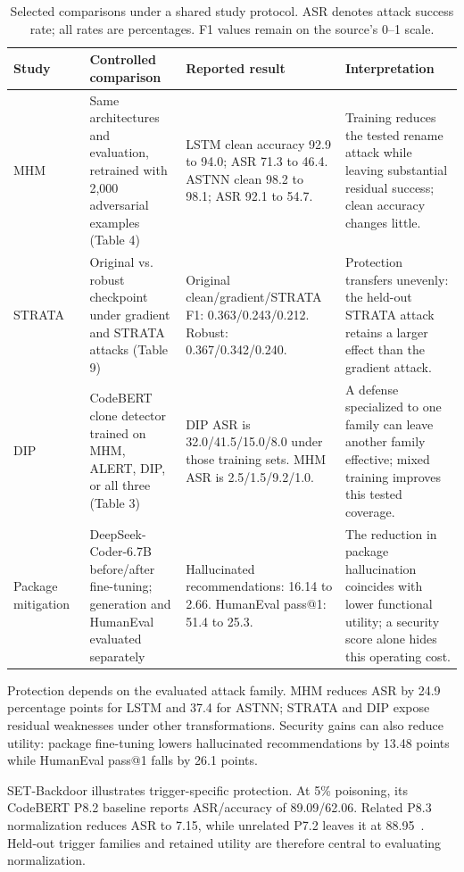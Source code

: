 \documentclass[acmsmall,screen,review,nonacm]{acmart}
\begin{document}
\begin{table}[t]
\centering
\small
\caption{Selected comparisons under a shared study protocol. ASR denotes attack success rate; all rates are percentages. F1 values remain on the source's 0--1 scale.}
\label{tab:within-study}
\begin{tabularx}{\textwidth}{@{}L{2.15cm}L{3.45cm}L{4.1cm}Y@{}}
\toprule
\textbf{Study} & \textbf{Controlled comparison} & \textbf{Reported result} & \textbf{Interpretation} \\
\midrule
MHM~\cite{zhang2020generating} & Same architectures and evaluation, retrained with 2,000 adversarial examples (Table 4) & LSTM clean accuracy 92.9 to 94.0; ASR 71.3 to 46.4. ASTNN clean 98.2 to 98.1; ASR 92.1 to 54.7. & Training reduces the tested rename attack while leaving substantial residual success; clean accuracy changes little. \\
STRATA~\cite{springer2020strata} & Original vs. robust checkpoint under gradient and STRATA attacks (Table 9) & Original clean/gradient/STRATA F1: 0.363/0.243/0.212. Robust: 0.367/0.342/0.240. & Protection transfers unevenly: the held-out STRATA attack retains a larger effect than the gradient attack. \\
DIP~\cite{na2023dip} & CodeBERT clone detector trained on MHM, ALERT, DIP, or all three (Table 3) & DIP ASR is 32.0/41.5/15.0/8.0 under those training sets. MHM ASR is 2.5/1.5/9.2/1.0. & A defense specialized to one family can leave another family effective; mixed training improves this tested coverage. \\
Package mitigation~\cite{spracklen2025package} & DeepSeek-Coder-6.7B before/after fine-tuning; generation and HumanEval evaluated separately & Hallucinated recommendations: 16.14 to 2.66. HumanEval pass@1: 51.4 to 25.3. & The reduction in package hallucination coincides with lower functional utility; a security score alone hides this operating cost. \\
\bottomrule
\end{tabularx}
\end{table}

Protection depends on the evaluated attack family. MHM reduces ASR by 24.9 percentage points for LSTM and 37.4 for ASTNN; STRATA and DIP expose residual weaknesses under other transformations. Security gains can also reduce utility: package fine-tuning lowers hallucinated recommendations by 13.48 points while HumanEval pass@1 falls by 26.1 points.

SET-Backdoor illustrates trigger-specific protection. At 5\% poisoning, its CodeBERT P8.2 baseline reports ASR/accuracy of 89.09/62.06. Related P8.3 normalization reduces ASR to 7.15, while unrelated P7.2 leaves it at 88.95~\cite{ye2025set}. Held-out trigger families and retained utility are therefore central to evaluating normalization.
\end{document}
